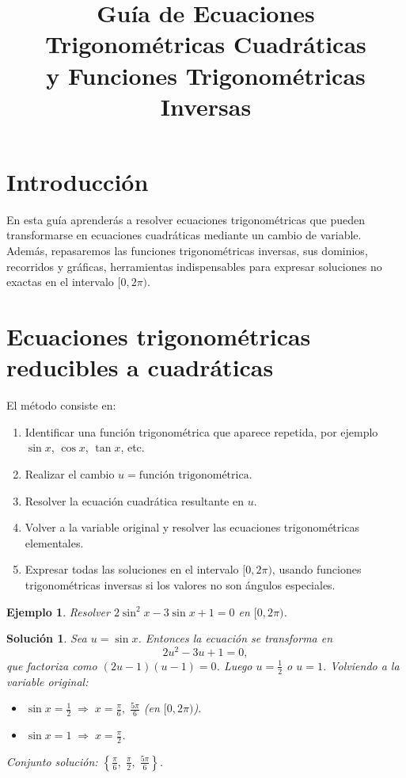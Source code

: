 \documentclass[12pt,a4paper]{article}
\title{\textbf{Guía de Ecuaciones Trigonométricas Cuadráticas\\ 
y Funciones Trigonométricas Inversas}}
\author{}
\date{}
\newtheorem{ejemplo}{Ejemplo}
\newtheorem*{sol}{Solución}
\begin{document}
\maketitle

\section{Introducción}
En esta guía aprenderás a resolver ecuaciones trigonométricas que pueden transformarse en ecuaciones cuadráticas mediante un cambio de variable. Además, repasaremos las funciones trigonométricas inversas, sus dominios, recorridos y gráficas, herramientas indispensables para expresar soluciones no exactas en el intervalo $[0,2\pi)$.

\section{Ecuaciones trigonométricas reducibles a cuadráticas}
El método consiste en:
\begin{enumerate}
    \item Identificar una función trigonométrica que aparece repetida, por ejemplo $\sin x$, $\cos x$, $\tan x$, etc.
    \item Realizar el cambio $u = \text{función trigonométrica}$.
    \item Resolver la ecuación cuadrática resultante en $u$.
    \item Volver a la variable original y resolver las ecuaciones trigonométricas elementales.
    \item Expresar todas las soluciones en el intervalo $[0,2\pi)$, usando funciones trigonométricas inversas si los valores no son ángulos especiales.
\end{enumerate}

\begin{ejemplo}
Resolver $2\sin^2 x - 3\sin x + 1 = 0$ en $[0,2\pi)$.
\end{ejemplo}
\begin{sol}
Sea $u = \sin x$. Entonces la ecuación se transforma en
\[
2u^2 - 3u + 1 = 0,
\]
que factoriza como $(2u-1)(u-1)=0$. Luego $u = \frac{1}{2}$ o $u = 1$.
Volviendo a la variable original:
\begin{itemize}
    \item $\sin x = \frac{1}{2} \;\Rightarrow\; x = \frac{\pi}{6},\; \frac{5\pi}{6}$ (en $[0,2\pi)$).
    \item $\sin x = 1 \;\Rightarrow\; x = \frac{\pi}{2}$.
\end{itemize}
Conjunto solución: $\left\{\frac{\pi}{6},\; \frac{\pi}{2},\; \frac{5\pi}{6}\right\}$.
\end{sol}
\end{document}
